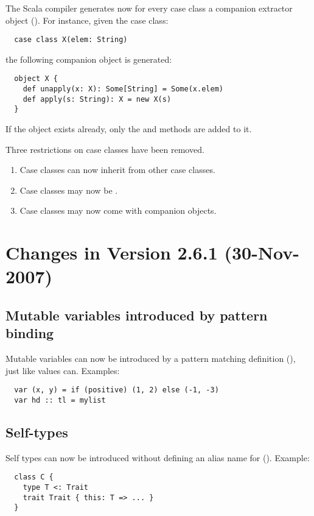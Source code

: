 The Scala compiler generates now for every case class a companion
extractor object ().
For instance, given the case class:
\begin{lstlisting}
  case class X(elem: String)
\end{lstlisting}
the following companion object is generated:
\begin{lstlisting}
  object X {
    def unapply(x: X): Some[String] = Some(x.elem)
    def apply(s: String): X = new X(s)
  }
\end{lstlisting}
If the object exists already, only the \lstinline@apply@ and \lstinline@unapply@ methods
are added to it.

Three restrictions on case classes have been removed.
\begin{enumerate}
\item
Case classes can now inherit from other case classes.
\item
Case classes may now be \lstinline@abstract@.
\item 
Case classes may now come with companion objects.
\end{enumerate}

\section*{Changes in Version 2.6.1 (30-Nov-2007)}

\subsection*{Mutable variables introduced by pattern binding}

Mutable variables can now be introduced by a pattern matching
definition (), just like values can. Examples:
\begin{lstlisting}
  var (x, y) = if (positive) (1, 2) else (-1, -3)
  var hd :: tl = mylist
\end{lstlisting}

\subsection*{Self-types}

Self types can now be introduced without defining an alias name for
\lstinline@this@ (). Example:
\begin{lstlisting}
  class C {
    type T <: Trait
    trait Trait { this: T => ... }
  }
\end{lstlisting}

